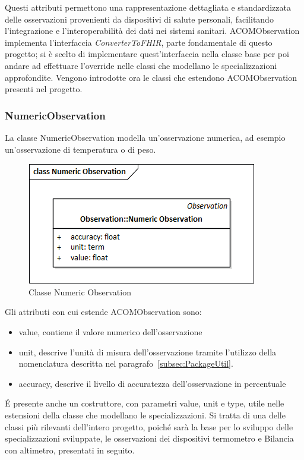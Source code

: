 \documentclass[a4paper]{article}
\begin{document}
Questi attributi permettono una rappresentazione dettagliata e standardizzata delle osservazioni provenienti da dispositivi di salute personali, facilitando l'integrazione e l'interoperabilità dei dati nei sistemi sanitari.
ACOMObservation implementa l'interfaccia \textit{ConverterToFHIR}, parte fondamentale di questo progetto; si è scelto di implementare quest'interfaccia nella classe base per poi andare ad effettuare l'override nelle classi che modellano le specializzazioni approfondite.
Vengono introdotte ora le classi che estendono ACOMObservation presenti nel progetto.
\subsubsection{NumericObservation}
La classe NumericObservation modella un'osservazione numerica, ad esempio un'osservazione di temperatura o di peso. 
\begin{figure}[H]
    \centering
    \includegraphics[width=1\linewidth]{figures/image.png}
    \caption{Classe Numeric Observation}
    \label{fig:numeric-observation}
\end{figure}
Gli attributi con cui estende ACOMObservation sono:
\begin{itemize}
    \item value, contiene il valore numerico dell'osservazione
    \item unit, descrive l'unità di misura dell'osservazione tramite l'utilizzo della nomenclatura descritta nel paragrafo~\ref{subsec:PackageUtil}.
    \item accuracy, descrive il livello di accuratezza dell'osservazione in percentuale
\end{itemize}
\'E presente anche un costruttore, con parametri value, unit e type, utile nelle estensioni della classe che modellano le specializzazioni.
Si tratta di una delle classi più rilevanti dell'intero progetto, poiché sarà la base per lo sviluppo delle specializzazioni sviluppate, le osservazioni dei dispositivi termometro e Bilancia con altimetro, presentati in seguito.
\end{document}
